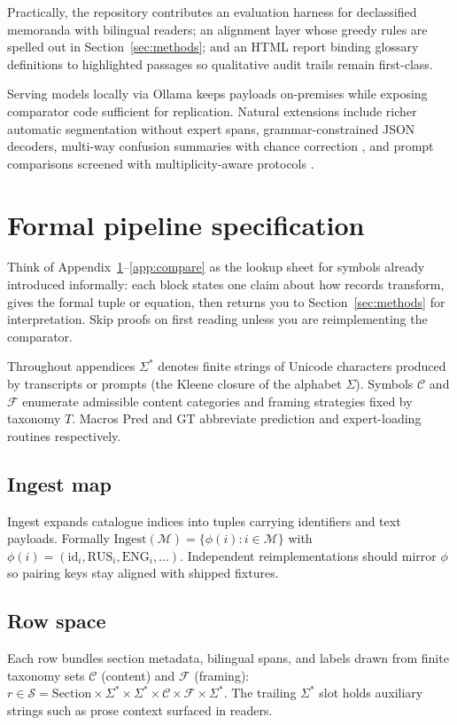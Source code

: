 \documentclass[11pt,a4paper]{article}
\theoremstyle{remark}
\newcommand{\Sig}{\Sigma^\ast}
\newcommand{\Pred}{\mathrm{Pred}}
\newcommand{\GT}{\mathrm{GT}}
\begin{document}
Practically, the repository contributes an evaluation harness for declassified memoranda with bilingual readers; an alignment layer whose greedy rules are spelled out in Section~\ref{sec:methods}; and an HTML report binding glossary definitions to highlighted passages so qualitative audit trails remain first-class.

Serving models locally via Ollama keeps payloads on-premises while exposing comparator code sufficient for replication. Natural extensions include richer automatic segmentation without expert spans, grammar-constrained JSON decoders, multi-way confusion summaries with chance correction \citep{cohen1960coefficient,carletta1996assessing}, and prompt comparisons screened with multiplicity-aware protocols \citep{benjamini1995controlling}.

\appendix

\section{Formal pipeline specification}
\label{app:formal}

Think of Appendix~\ref{app:formal}--\ref{app:compare} as the lookup sheet for symbols already introduced informally: each block states one claim about how records transform, gives the formal tuple or equation, then returns you to Section~\ref{sec:methods} for interpretation. Skip proofs on first reading unless you are reimplementing the comparator.

Throughout appendices $\Sig$ denotes finite strings of Unicode characters produced by transcripts or prompts (the Kleene closure of the alphabet $\Sigma$). Symbols $\mathcal{C}$ and $\mathcal{F}$ enumerate admissible content categories and framing strategies fixed by taxonomy $T$. Macros $\Pred$ and $\GT$ abbreviate prediction and expert-loading routines respectively.

\subsection{Ingest map}
Ingest expands catalogue indices into tuples carrying identifiers and text payloads. Formally $\mathrm{Ingest}(\mathcal{M}) = \{\phi(i): i\in\mathcal{M}\}$ with $\phi(i)=(\mathrm{id}_i,\mathrm{RUS}_i,\mathrm{ENG}_i,\ldots)$. Independent reimplementations should mirror $\phi$ so pairing keys stay aligned with shipped fixtures.

\subsection{Row space}
Each row bundles section metadata, bilingual spans, and labels drawn from finite taxonomy sets $\mathcal{C}$ (content) and $\mathcal{F}$ (framing):
$r\in\mathcal{S}=\mathrm{Section}\times\Sig\times\Sig\times\mathcal{C}\times\mathcal{F}\times\Sig.$
The trailing $\Sig$ slot holds auxiliary strings such as prose context surfaced in readers.
\end{document}

